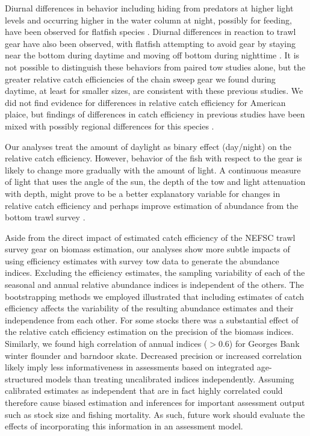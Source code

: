 \documentclass[
  12pt,
]{article}
\begin{document}
Diurnal differences in behavior including hiding from predators at
higher light levels and occurring higher in the water column at night,
possibly for feeding, have been observed for flatfish species
\citep{hempel64,verheijendegroot67,burrowsetal94,burrowsgibson95,ellisetal97,hurstduffy05}.
Diurnal differences in reaction to trawl gear have also been observed,
with flatfish attempting to avoid gear by staying near the bottom during
daytime and moving off bottom during nighttime \citep{ryerbarnett06}. It
is not possible to distinguish these behaviors from paired tow studies
alone, but the greater relative catch efficiencies of the chain sweep
gear we found during daytime, at least for smaller sizes, are consistent
with these previous studies. We did not find evidence for differences in
relative catch efficiency for American plaice, but findings of
differences in catch efficiency in previous studies have been mixed with
possibly regional differences for this species
\citep{beamish66, walsh91, caseymyers98}.

Our analyses treat the amount of daylight as binary effect (day/night)
on the relative catch efficiency. However, behavior of the fish with
respect to the gear is likely to change more gradually with the amount
of light. A continuous measure of light that uses the angle of the sun,
the depth of the tow and light attenuation with depth, might prove to be
a better explanatory variable for changes in relative catch efficiency
and perhaps improve estimation of abundance from the bottom trawl survey
\citep{jacobsonetal15,kaingeetal17}.

Aside from the direct impact of estimated catch efficiency of the NEFSC
trawl survey gear on biomass estimation, our analyses show more subtle
impacts of using efficiency estimates with survey tow data to generate
the abundance indices. Excluding the efficiency estimates, the sampling
variability of each of the seasonal and annual relative abundance
indices is independent of the others. The bootstrapping methods we
employed illustrated that including estimates of catch efficiency
affects the variability of the resulting abundance estimates and their
independence from each other. For some stocks there was a substantial
effect of the relative catch efficiency estimation on the precision of
the biomass indices. Similarly, we found high correlation of annual
indices (\(> 0.6\)) for Georges Bank winter flounder and barndoor skate.
Decreased precision or increased correlation likely imply less
informativeness in assessments based on integrated age-structured models
than treating uncalibrated indices independently. Assuming calibrated
estimates as independent that are in fact highly correlated could
therefore cause biased estimation and inferences for important
assessment output such as stock size and fishing mortality. As such,
future work should evaluate the effects of incorporating this
information in an assessment model.
\end{document}
